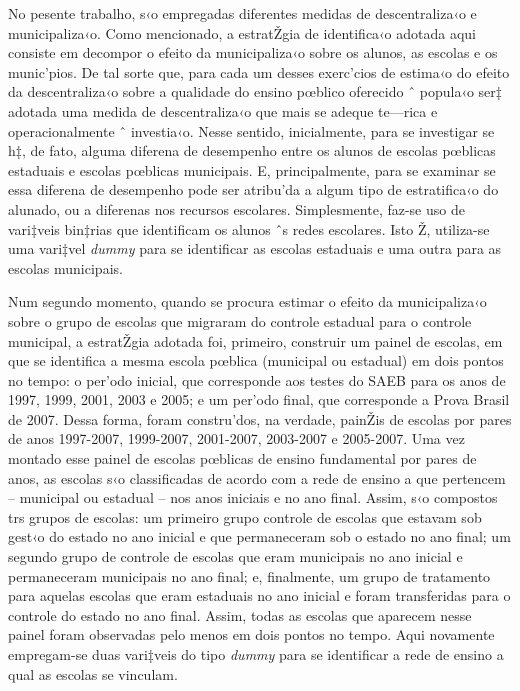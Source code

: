 \documentclass[a4paper, 12pt]{article}
\begin{document}
No pesente trabalho, s‹o empregadas diferentes medidas de descentraliza‹o e municipaliza‹o. Como mencionado, a estratŽgia de identifica‹o adotada aqui consiste em decompor o efeito da municipaliza‹o sobre os alunos, as escolas e os munic’pios. De tal sorte que, para cada um desses exerc’cios de estima‹o do efeito da descentraliza‹o sobre a qualidade do ensino pœblico oferecido ˆ popula‹o ser‡ adotada uma medida de descentraliza‹o que mais se adeque te—rica e operacionalmente ˆ investia‹o. Nesse sentido, inicialmente, para se investigar se h‡, de fato, alguma diferena de desempenho entre os alunos de escolas pœblicas estaduais e escolas pœblicas municipais. E, principalmente, para se examinar se essa diferena de desempenho pode ser atribu’da a algum tipo de estratifica‹o do alunado, ou a diferenas nos recursos escolares. Simplesmente, faz-se uso de vari‡veis bin‡rias que identificam os alunos ˆs redes escolares. Isto Ž, utiliza-se uma vari‡vel \emph{dummy} para se identificar as escolas estaduais e uma outra para as escolas municipais. 

Num segundo momento, quando se procura estimar o efeito da municipaliza‹o sobre o grupo de escolas que migraram do controle estadual para o controle municipal, a estratŽgia adotada foi, primeiro, construir um painel de escolas, em que se identifica a mesma escola pœblica (municipal ou estadual) em dois pontos no tempo: o per’odo inicial, que corresponde aos testes do SAEB para os anos de 1997, 1999, 2001, 2003 e 2005; e um per’odo final, que corresponde a Prova Brasil de 2007. Dessa forma, foram constru’dos, na verdade, painŽis de escolas por pares de anos 1997-2007, 1999-2007, 2001-2007, 2003-2007 e 2005-2007. Uma vez montado esse painel de escolas pœblicas de ensino fundamental por pares de anos, as escolas s‹o classificadas de acordo com a rede de ensino a que pertencem -- municipal  ou estadual -- nos anos iniciais e no ano final. Assim, s‹o compostos trs grupos de escolas: um primeiro grupo controle de escolas que estavam sob gest‹o do estado no ano inicial e que permaneceram sob o estado no ano final; um segundo grupo de controle de escolas que eram municipais no ano inicial e permaneceram municipais no ano final; e, finalmente, um grupo de tratamento para aquelas escolas que eram estaduais no ano inicial e foram transferidas para o controle do estado no ano final. Assim, todas as escolas que aparecem nesse painel foram observadas pelo menos em dois pontos no tempo. Aqui novamente empregam-se duas vari‡veis do tipo \emph{dummy} para se identificar a rede de ensino a qual as escolas se vinculam.
\end{document}
